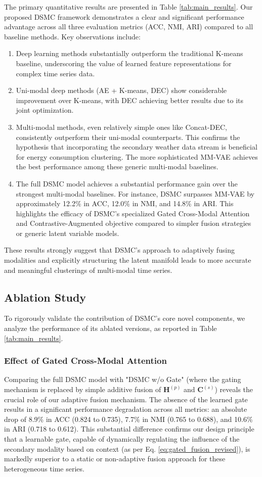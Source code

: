 \documentclass[journal]{IEEEtran}
\begin{document}
The primary quantitative results are presented in Table \ref{tab:main_results}. Our proposed DSMC framework demonstrates a clear and significant performance advantage across all three evaluation metrics (ACC, NMI, ARI) compared to all baseline methods. Key observations include:
\begin{enumerate}
    \item Deep learning methods substantially outperform the traditional K-means baseline, underscoring the value of learned feature representations for complex time series data.
    \item Uni-modal deep methods (AE + K-means, DEC) show considerable improvement over K-means, with DEC achieving better results due to its joint optimization.
    \item Multi-modal methods, even relatively simple ones like Concat-DEC, consistently outperform their uni-modal counterparts. This confirms the hypothesis that incorporating the secondary weather data stream is beneficial for energy consumption clustering. The more sophisticated MM-VAE achieves the best performance among these generic multi-modal baselines.
    \item The full DSMC model achieves a substantial performance gain over the strongest multi-modal baselines. For instance, DSMC surpasses MM-VAE by approximately 12.2\% in ACC, 12.0\% in NMI, and 14.8\% in ARI. This highlights the efficacy of DSMC's specialized Gated Cross-Modal Attention and Contrastive-Augmented objective compared to simpler fusion strategies or generic latent variable models.
\end{enumerate}
These results strongly suggest that DSMC's approach to adaptively fusing modalities and explicitly structuring the latent manifold leads to more accurate and meaningful clusterings of multi-modal time series.

\subsection{Ablation Study}
To rigorously validate the contribution of DSMC's core novel components, we analyze the performance of its ablated versions, as reported in Table \ref{tab:main_results}.

\subsubsection{Effect of Gated Cross-Modal Attention}
Comparing the full DSMC model with "DSMC w/o Gate" (where the gating mechanism is replaced by simple additive fusion of $\mathbf{H}^{(p)}$ and $\mathbf{C}^{(s)}$) reveals the crucial role of our adaptive fusion mechanism. The absence of the learned gate results in a significant performance degradation across all metrics: an absolute drop of 8.9\% in ACC (0.824 to 0.735), 7.7\% in NMI (0.765 to 0.688), and 10.6\% in ARI (0.718 to 0.612). This substantial difference confirms our design principle that a learnable gate, capable of dynamically regulating the influence of the secondary modality based on context (as per Eq. \ref{eq:gated_fusion_revised}), is markedly superior to a static or non-adaptive fusion approach for these heterogeneous time series.
\end{document}
